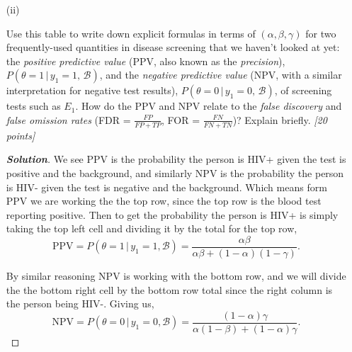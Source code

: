 \documentclass[12pt]{article}
\newcommand{\given}{\, | \,}
\newenvironment{solution}{\begin{proof}[\textbf{\textit{Solution}}] }{\end{proof}}
\begin{document}
\begin{itemize}
\begin{itemize}
\begin{tcolorbox}[breakable]
\begin{solution}
        For the \textbf{bottom left} and \textbf{top right} boxes they follow immediately from what they are asking based on the above and under the law of total probability. Like for example the left column is based on truly HIV+ people, which is why we need $\alpha$ (prevelance) in each box, therefore the right column must have $(1-\alpha)$. Then similarly for the rows we can easily fill in the rest of the cells.
    \end{solution}
\end{tcolorbox}
\newpage
\item[(ii)]

Use this table to write down explicit formulas in terms of $( \alpha, \beta, \gamma )$ for two frequently-used quantities in disease screening that we haven't looked at yet: the \textit{positive predictive value} (PPV, also known as the \textit{precision}), $P ( \theta = 1 \given y_1 = 1, \, \mathcal{ B })$, and the \textit{negative predictive value} (NPV, with a similar interpretation for negative test results), $P ( \theta = 0 \given y_1 = 0, \, \mathcal{ B } )$, of screening tests such as $E_1$. How do the PPV and NPV relate to the \textit{false discovery} and \textit{false omission rates} (FDR = $\frac{ FP }{ FP + TP }$, FOR = $\frac{ FN }{ FN + TN }$)? Explain briefly. \textit{[20 points]}

\begin{tcolorbox}[breakable]
    \begin{solution}
        We see PPV is the probability the person is HIV+ given the test is positive and the background, and similarly NPV is the probability the person is HIV- given the test is negative and the background. Which means form PPV we are working the the top row, since the top row is the blood test reporting positive. Then to get the probability the person is HIV+ is simply taking the top left cell and dividing it by the total for the top row,
        \[\text{PPV} = P(\theta = 1 \given y_1 =1 , \mathcal{B}) = \frac{\alpha\beta}{\alpha\beta + (1-\alpha)(1-\gamma)}.\]

        By similar reasoning NPV is working with the bottom row, and we will divide the the bottom right cell by the bottom row total since the right column is the person being HIV-. Giving us,
        \[\text{NPV} = P(\theta = 0 \given y_1 = 0, \mathcal{B})= \frac{(1-\alpha)\gamma}{\alpha(1-\beta) + (1-\alpha)\gamma}.\]


\end{solution}
\end{tcolorbox}
\end{itemize}
\end{itemize}
\end{document}
